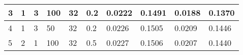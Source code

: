 \begin{table}
{\begin{tabular}{|llllllllll|}
3             & 1                                                               & 3                                                               & 100            & 32                                                             & 0.2              & 0.0222                                                                    & 0.1491                                                                   & 0.0188                                                               & 0.1370                                                              \\ \hline
4             & 1                                                               & 3                                                               & 50             & 32                                                             & 0.2              & 0.0226                                                                    & 0.1505                                                                   & 0.0209                                                               & 0.1446                                                              \\ \hline
5             & 2                                                               & 1                                                               & 100            & 32                                                             & 0.5              & 0.0227                                                                    & 0.1506                                                                   & 0.0207                                                               & 0.1440                                                              \\ \hline
\end{tabular}}
\end{table}
